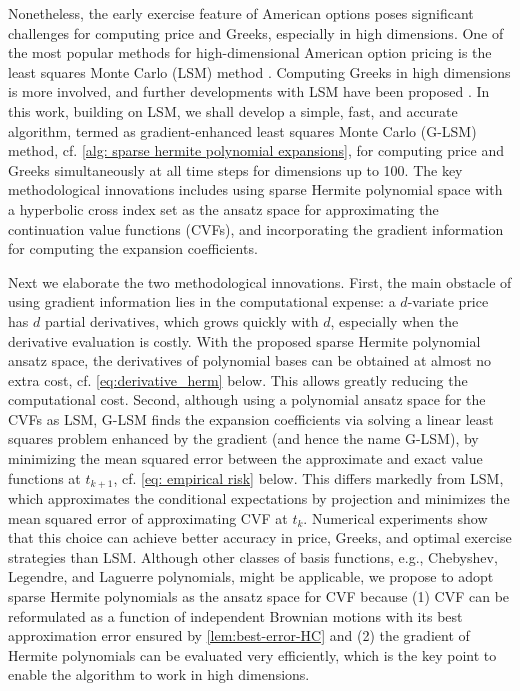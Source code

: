 \documentclass[10pt,a4paper]{amsart}
\numberwithin{equation}{section}
\numberwithin{algorithm}{section}
\theoremstyle{plain}
\theoremstyle{remark}
\begin{document}
Nonetheless, the early exercise feature of American options poses significant challenges for computing price and Greeks, especially in high dimensions. One of the most popular methods for high-dimensional American option pricing is the least squares Monte Carlo (LSM) method \cite{longstaff2001valuing, tsitsiklis2001regression}. Computing Greeks in high dimensions is more involved, and further developments with LSM have been proposed \cite{wang2009pricing, bouchard2012monte}.
In this work, building on LSM, we shall develop a simple, fast, and accurate algorithm, termed as gradient-enhanced least squares Monte Carlo (G-LSM) method, cf. \cref{alg: sparse hermite polynomial expansions}, for computing price and Greeks simultaneously at all time steps for dimensions up to 100. The key methodological innovations includes using sparse Hermite polynomial space with a hyperbolic cross index set as the ansatz space for approximating the continuation value functions (CVFs), and incorporating the gradient information for computing the expansion coefficients.

Next we elaborate the two methodological innovations. First, the main obstacle of using gradient information lies in the computational expense: a $d$-variate price has $d$ partial derivatives, which grows quickly with $d$, especially when the derivative evaluation is costly. With the proposed sparse Hermite polynomial ansatz space, the derivatives of polynomial bases can be obtained at almost no extra cost, cf. \cref{eq:derivative_herm} below. This allows greatly reducing the computational cost. Second, although using a polynomial ansatz space for the CVFs as LSM, G-LSM finds  the expansion coefficients via solving a linear least squares problem enhanced by the gradient (and hence the name G-LSM), by minimizing the mean squared error between the approximate and exact value functions at $t_{k+1}$, cf. \cref{eq: empirical risk} below. This differs markedly from LSM, which approximates the conditional expectations by projection and minimizes the mean squared error of approximating CVF at $t_k$. Numerical experiments show that this choice can achieve better accuracy in price, Greeks, and optimal exercise strategies than LSM. Although other classes of basis functions, e.g., Chebyshev, Legendre, and Laguerre polynomials, might be applicable, we propose to adopt sparse Hermite polynomials as the ansatz space for CVF because (1) CVF can be reformulated as a function of independent Brownian motions with its best approximation error ensured by  \cref{lem:best-error-HC} and (2) the gradient of Hermite polynomials can be evaluated very efficiently, which is the key point to enable the algorithm to work in high dimensions.
\end{document}
